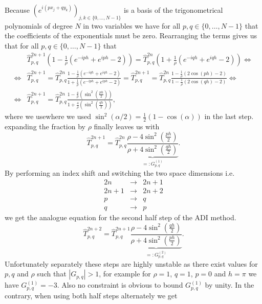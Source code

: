 \documentclass[a4aper,pagesize]{scrartcl}
\theoremstyle{definition}
\theoremstyle{plain}
\theoremstyle{remark}
\renewcommand{\hat}{\widehat}
\begin{document}
Because $(e^{i(px_{j} + qy_{k})})_{j,k \in \{0, ..., N-1\}}$ is a basis of the trigonometrical polynomials of degree $N$ in two variables we have for all $p,q \in \{0, \dots, N-1\}$ that the coefficients of the exponentials must be zero. Rearranging the terms gives us that for all $p,q \in \{0, \dots, N-1\}$ that
\begin{align}
	&\hat{T}_{p,q}^{2n+1}
	\left(
		1
		-\frac{1}{\rho}\left(
			e^{-iph}
			+ e^{iph}
			- 2
		\right)
	\right)
	=
	\hat{T}_{p,q}^{2n}
	\left(
		1
		+\frac{1}{\rho}\left(
			e^{-iqh}
			+ e^{iqh}
			- 2
		\right)
	\right)
\Leftrightarrow\\
\Leftrightarrow&
	\hat{T}_{p,q}^{2n+1}
	=
	\hat{T}_{p,q}^{2n}
	\frac{
		1
		-\frac{1}{\rho}\left(
			e^{-iqh}
			+ e^{iqh}
			- 2
		\right)
	}{
		1
		+\frac{1}{\rho}\left(
			e^{-iph}
			+ e^{iph}
			- 2
		\right)
	}
	=
	\hat{T}_{p,q}^{2n+1}
	=
	\hat{T}_{p,q}^{2n}
	\frac{
		1-\frac{1}{\rho}(2\cos(ph)- 2)
	}{
		1-\frac{1}{\rho}(2\cos(qh)- 2)
	}
\Leftrightarrow\\
\Leftrightarrow&
	\hat{T}_{p,q}^{2n+1}
	=
	\hat{T}_{p,q}^{2n}
	\frac{
		1-\frac{4}{\rho}\left(\sin^2\left(\frac{ph}{2}\right)\right)
	}{
		1+\frac{4}{\rho}\left(\sin^2\left(\frac{qh}{2}\right)\right)
	},
\end{align}
where we usewhere we used $\sin^2(\alpha/2) = \frac{1}{2}(1-\cos(\alpha))$ in the last step. expanding the fraction by $\rho$ finally leaves us with
\begin{equation}
	\hat{T}_{p,q}^{2n+1}
	=
	\hat{T}_{p,q}^{2n}
	\underbrace{
		\frac{
			\rho-4\sin^2\left(\frac{ph}{2}\right)
		}{
			\rho+4\sin^2\left(\frac{qh}{2}\right)
		}
	}_{=:G_{p,q}^{(1)}}.
	\label{eq:AdiNeumann1}
\end{equation}
By performing an index shift and switching the two space dimensions i.e.
\begin{eqnarray*}
	2n &\rightarrow &2n+1\\
	2n+1 &\rightarrow &2n+2\\
	p &\rightarrow &q\\
	q &\rightarrow &p
\end{eqnarray*}
we get the analogue equation for the second half step of the ADI method.
\begin{equation}
	\hat{T}_{p,q}^{2n+2}
	=
	\hat{T}_{p,q}^{2n+1}
	\underbrace{
		\frac{
			\rho-4\sin^2\left(\frac{qh}{2}\right)
		}{
			\rho+4\sin^2\left(\frac{ph}{2}\right)
		}
	}_{=:G_{p,q}^{(2)}}.
\end{equation}
Unfortunately separately these steps are highly unstable as there exist values for $p,q$ and $\rho$ such that $|G_{p,q}|>1$, for example for $\rho = 1$, $q = 1$, $p = 0$ and $h = \pi$ we have $G_{p,q}^{(1)} = -3$. Also no constraint is obvious to bound $G_{p,q}^{(1)}$ by unity. In the contrary, when using both half steps alternately we get
\end{document}
